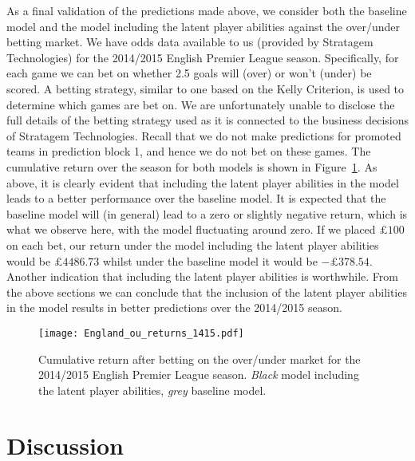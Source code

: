 \documentclass[11pt,a4paper]{article}
\begin{document}
As a final validation of the predictions made above, we consider both 
the baseline model and the model including the latent player abilities 
against the over/under betting market. We have odds data available to 
us (provided by Stratagem Technologies) for the 2014/2015 English 
Premier League season. Specifically, for 
each game we can bet on whether 2.5 goals will (over) or won't (under) 
be scored. A betting strategy, similar to one based on the Kelly 
Criterion, is used to determine which games are bet 
on. We are unfortunately unable to disclose the full details of the 
betting strategy used as it is connected to the business decisions 
of Stratagem Technologies. Recall that we do not make predictions for promoted teams 
in prediction block 1, and hence we do not bet on these games. 
The cumulative return over the season for both models is 
shown in Figure~\ref{engoufig}. As above, it is clearly evident that 
including the latent player abilities in the model leads to a better 
performance over the baseline model. It is expected that the baseline 
model will (in general) lead to a zero or slightly negative return, 
which is what we observe here, with the model fluctuating around zero. 
If we placed $\pounds 100$ on each bet, our return under the model 
including the latent player abilities would be $\pounds 4486.73$ whilst 
under the baseline model it would be $-\pounds 378.54$. Another indication 
that including the latent player abilities is worthwhile. From the above 
sections we can conclude that the inclusion of the latent player 
abilities in the model results in better predictions over the 
2014/2015 season.
 





\begin{figure}%
      \centering
      \texttt{[image: England\_ou\_returns\_1415.pdf]}
      \caption{Cumulative return after betting on the over/under market for the 2014/2015 English Premier League season. \emph{Black} model including the latent player abilities, \emph{grey} baseline model.} \label{engoufig}
\end{figure} 

 
















\section{Discussion} \label{disc}
\end{document}
